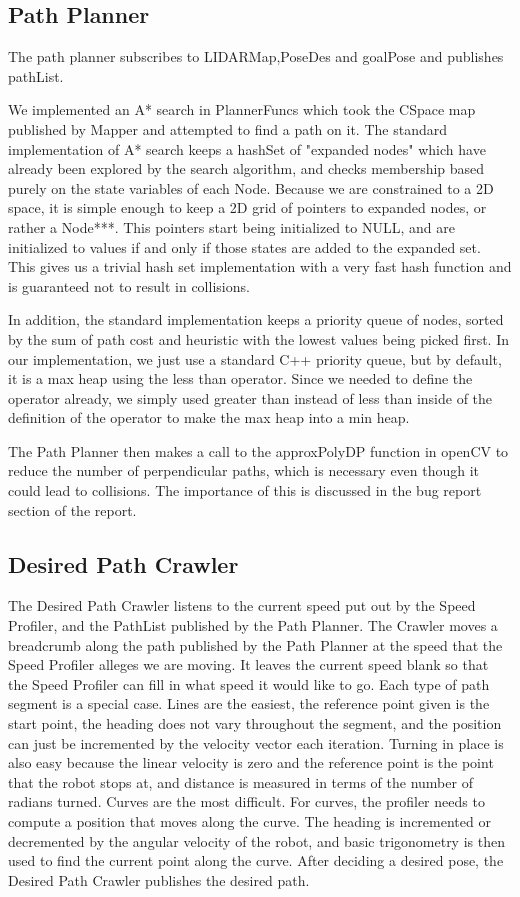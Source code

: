 \documentclass{article}
\begin{document}
\subsection{Path Planner}

The path planner subscribes to LIDARMap,PoseDes and goalPose and publishes pathList.

We implemented an A* search in PlannerFuncs which took the CSpace map published by Mapper and attempted to find a path on it.
The standard implementation of A* search keeps a hashSet of "expanded nodes" which have already been explored by the search algorithm, and checks membership based purely on the state variables of each Node.  
Because we are constrained to a 2D space, it is simple enough to keep a 2D grid of pointers to expanded nodes, or rather a Node***. 
This pointers start being initialized to NULL, and are initialized to values if and only if those states are added to the expanded set.
This gives us a trivial hash set implementation with a very fast hash function and is guaranteed not to result in collisions.

In addition, the standard implementation keeps a priority queue of nodes, sorted by the sum of path cost and heuristic with the lowest values being picked first.
In our implementation, we just use a standard C++ priority queue, but by default, it is a max heap using the less than operator.
Since we needed to define the operator already, we simply used greater than instead of less than inside of the definition of the operator to make the max heap into a min heap.

The Path Planner then makes a call to the approxPolyDP function in openCV to reduce the number of perpendicular paths, which is necessary even though it could lead to collisions.
The importance of this is discussed in the bug report section of the report.

\subsection{Desired Path Crawler}

The Desired Path Crawler listens to the current speed put out by the Speed Profiler, and the PathList published by the Path Planner.
The Crawler moves a breadcrumb along the path published by the Path Planner at the speed that the Speed Profiler alleges we are moving.
It leaves the current speed blank so that the Speed Profiler can fill in what speed it would like to go.
Each type of path segment is a special case.
Lines are the easiest, the reference point given is the start point, the heading does not vary throughout the segment, and the position can just be incremented by the velocity vector each iteration.
Turning in place is also easy because the linear velocity is zero and the reference point is the point that the robot stops at, and distance is measured in terms of the number of radians turned.
Curves are the most difficult. 
For curves, the profiler needs to compute a position that moves along the curve. 
The heading is incremented or decremented by the angular velocity of the robot, and basic trigonometry is then used to find the current point along the curve.
After deciding a desired pose, the Desired Path Crawler publishes the desired path.
\end{document}
